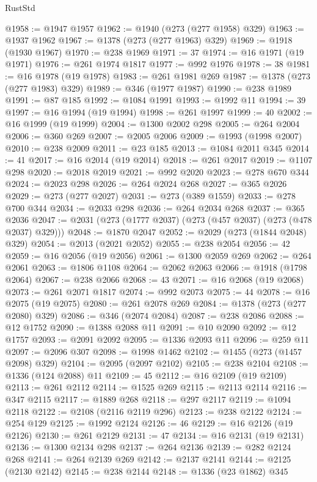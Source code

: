 \begin{lexlean}{RustStd}
\begin{coremodule}
{{{{{{{{{{{{{{{{{{{@1958 := @1947 @1957
@1962 := @1940 (@273 (@277 @1958) @329)
@1963 := @1937 @1962
@1967 := @1378 (@273 (@277 @1963) @329)
@1969 := @1918 (@1930 @1967)
@1970 := @238 @1969
@1971 := 37
@1974 := @16 @1971 (@19 @1971)
@1976 := @261 @1974 @1817
@1977 := @992 @1976
@1978 := 38
@1981 := @16 @1978 (@19 @1978)
@1983 := @261 @1981 @269
@1987 := @1378 (@273 (@277 @1983) @329)
@1989 := @346 (@1977 @1987)
@1990 := @238 @1989
@1991 := @87 @185
@1992 := @1084 @1991
@1993 := @1992 @11
@1994 := 39
@1997 := @16 @1994 (@19 @1994)
@1998 := @261 @1997
@1999 := 40
@2002 := @16 @1999 (@19 @1999)
@2004 := @1300 @2002 @298
@2005 := @264 @2004
@2006 := @360 @269
@2007 := @2005 @2006
@2009 := @1993 (@1998 @2007)
@2010 := @238 @2009
@2011 := @23 @185
@2013 := @1084 @2011 @345
@2014 := 41
@2017 := @16 @2014 (@19 @2014)
@2018 := @261 @2017
@2019 := @1107 @298
@2020 := @2018 @2019
@2021 := @992 @2020
@2023 := @278 @670 @344
@2024 := @2023 @298
@2026 := @264 @2024 @268
@2027 := @365 @2026
@2029 := @273 (@277 @2027)
@2031 := @273 (@389 @1559)
@2033 := @278 @700 @344
@2034 := @2033 @298
@2036 := @264 @2034 @268
@2037 := @365 @2036
@2047 := @2031 (@273 (@1777 @2037) (@273 (@457 @2037) (@273 (@478 @2037) @329)))
@2048 := @1870 @2047
@2052 := @2029 (@273 (@1844 @2048) @329)
@2054 := @2013 (@2021 @2052)
@2055 := @238 @2054
@2056 := 42
@2059 := @16 @2056 (@19 @2056)
@2061 := @1300 @2059 @269
@2062 := @264 @2061
@2063 := @1806 @1108
@2064 := @2062 @2063
@2066 := @1918 (@1798 @2064)
@2067 := @238 @2066
@2068 := 43
@2071 := @16 @2068 (@19 @2068)
@2073 := @261 @2071 @1817
@2074 := @992 @2073
@2075 := 44
@2078 := @16 @2075 (@19 @2075)
@2080 := @261 @2078 @269
@2084 := @1378 (@273 (@277 @2080) @329)
@2086 := @346 (@2074 @2084)
@2087 := @238 @2086
@2088 := @12 @1752
@2090 := @1388 @2088 @11
@2091 := @10 @2090
@2092 := @12 @1757
@2093 := @2091 @2092
@2095 := @1336 @2093 @11
@2096 := @259 @11
@2097 := @2096 @307
@2098 := @1998 @1462
@2102 := @1455 (@273 (@1457 @2098) @329)
@2104 := @2095 (@2097 @2102)
@2105 := @238 @2104
@2108 := @1336 (@124 @2088) @11
@2109 := 45
@2112 := @16 @2109 (@19 @2109)
@2113 := @261 @2112
@2114 := @1525 @269
@2115 := @2113 @2114
@2116 := @347 @2115
@2117 := @1889 @268
@2118 := @297 @2117
@2119 := @1094 @2118
@2122 := @2108 (@2116 @2119 @296)
@2123 := @238 @2122
@2124 := @254 @129
@2125 := @1992 @2124
@2126 := 46
@2129 := @16 @2126 (@19 @2126)
@2130 := @261 @2129
@2131 := 47
@2134 := @16 @2131 (@19 @2131)
@2136 := @1300 @2134 @298
@2137 := @264 @2136
@2139 := @282 @2124 @268
@2141 := @264 @2139 @269
@2142 := @2137 @2141
@2144 := @2125 (@2130 @2142)
@2145 := @238 @2144
@2148 := @1336 (@23 @1862) @345
}}}}}}}}}}}}}}}}}}}
\end{coremodule}
\end{lexlean}
